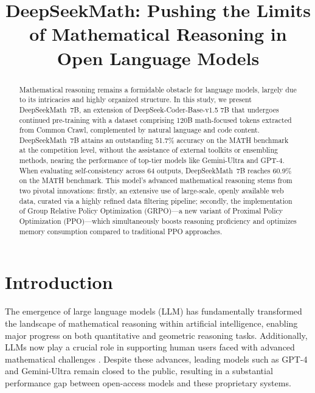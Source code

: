 \title{DeepSeekMath: Pushing the Limits of Mathematical Reasoning in Open Language Models}

\begin{abstract}
Mathematical reasoning remains a formidable obstacle for language models, largely due to its intricacies and highly organized structure. In this study, we present DeepSeekMath~7B, an extension of DeepSeek-Coder-Base-v1.5 7B that undergoes continued pre-training with a dataset comprising 120B math-focused tokens extracted from Common Crawl, complemented by natural language and code content. DeepSeekMath~7B attains an outstanding 51.7\% accuracy on the MATH benchmark at the competition level, without the assistance of external toolkits or ensembling methods, nearing the performance of top-tier models like Gemini-Ultra and GPT-4. When evaluating self-consistency across 64 outputs, DeepSeekMath~7B reaches 60.9\% on the MATH benchmark. This model’s advanced mathematical reasoning stems from two pivotal innovations: firstly, an extensive use of large-scale, openly available web data, curated via a highly refined data filtering pipeline; secondly, the implementation of Group Relative Policy Optimization (GRPO)—a new variant of Proximal Policy Optimization (PPO)—which simultaneously boosts reasoning proficiency and optimizes memory consumption compared to traditional PPO approaches.
\end{abstract}

\section{Introduction}

The emergence of large language models (LLM) has fundamentally transformed the landscape of mathematical reasoning within artificial intelligence, enabling major progress on both quantitative \citep{MATH} and geometric \citep{trinh2024solving} reasoning tasks. Additionally, LLMs now play a crucial role in supporting human users faced with advanced mathematical challenges \citep{tao}. Despite these advances, leading models such as GPT-4 \citep{gpt4} and Gemini-Ultra \citep{gemini} remain closed to the public, resulting in a substantial performance gap between open-access models and these proprietary systems.


